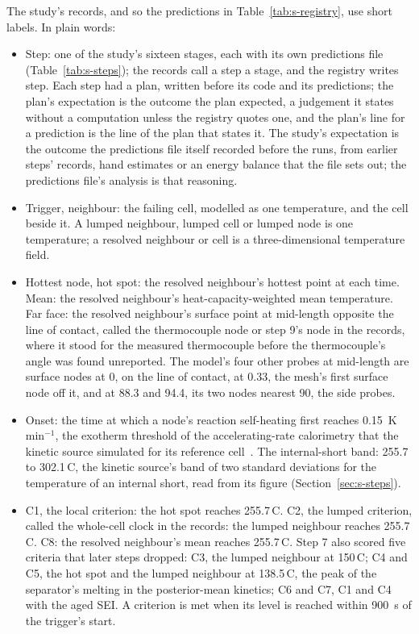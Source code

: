 \documentclass[preprint,12pt]{elsarticle}
\newcommand{\degC}{\,\textdegree C}
\begin{document}
The study's records, and so the predictions in Table~\ref{tab:s-registry}, use short labels. In plain words:
\begin{itemize}
\item Step: one of the study's sixteen stages, each with its own predictions file (Table~\ref{tab:s-steps}); the records call a step a stage, and the registry writes step. Each step had a plan, written before its code and its predictions; the plan's expectation is the outcome the plan expected, a judgement it states without a computation unless the registry quotes one, and the plan's line for a prediction is the line of the plan that states it. The study's expectation is the outcome the predictions file itself recorded before the runs, from earlier steps' records, hand estimates or an energy balance that the file sets out; the predictions file's analysis is that reasoning.
\item Trigger, neighbour: the failing cell, modelled as one temperature, and the cell beside it. A lumped neighbour, lumped cell or lumped node is one temperature; a resolved neighbour or cell is a three-dimensional temperature field.
\item Hottest node, hot spot: the resolved neighbour's hottest point at each time. Mean: the resolved neighbour's heat-capacity-weighted mean temperature. Far face: the resolved neighbour's surface point at mid-length opposite the line of contact, called the thermocouple node or step 9's node in the records, where it stood for the measured thermocouple before the thermocouple's angle was found unreported. The model's four other probes at mid-length are surface nodes at 0\textdegree, on the line of contact, at 0.33\textdegree, the mesh's first surface node off it, and at 88.3 and 94.4\textdegree, its two nodes nearest 90\textdegree, the side probes.
\item Onset: the time at which a node's reaction self-heating first reaches 0.15~K\,min$^{-1}$, the exotherm threshold of the accelerating-rate calorimetry that the kinetic source simulated for its reference cell~\cite{koenig2025uncertainty}. The internal-short band: 255.7 to 302.1\degC, the kinetic source's band of two standard deviations for the temperature of an internal short, read from its figure (Section~\ref{sec:s-steps}).
\item C1, the local criterion: the hot spot reaches 255.7\degC. C2, the lumped criterion, called the whole-cell clock in the records: the lumped neighbour reaches 255.7\degC. C8: the resolved neighbour's mean reaches 255.7\degC. Step 7 also scored five criteria that later steps dropped: C3, the lumped neighbour at 150\degC; C4 and C5, the hot spot and the lumped neighbour at 138.5\degC, the peak of the separator's melting in the posterior-mean kinetics; C6 and C7, C1 and C4 with the aged SEI. A criterion is met when its level is reached within 900~s of the trigger's start.

\end{itemize}
\end{document}
